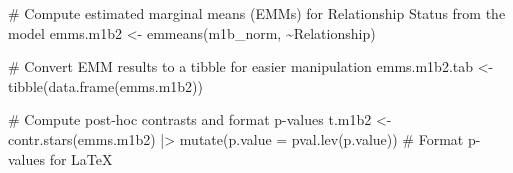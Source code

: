 \documentclass[
  bookmarksnumbered]{article}
\newenvironment{Shaded}{\begin{snugshade}}{\end{snugshade}}
\newcommand{\AttributeTok}[1]{\textcolor[rgb]{0.80,0.80,0.80}{#1}}
\newcommand{\CommentTok}[1]{\textcolor[rgb]{0.50,0.62,0.50}{#1}}
\newcommand{\FunctionTok}[1]{\textcolor[rgb]{0.94,0.94,0.56}{#1}}
\newcommand{\NormalTok}[1]{\textcolor[rgb]{0.80,0.80,0.80}{#1}}
\newcommand{\OtherTok}[1]{\textcolor[rgb]{0.94,0.94,0.56}{#1}}
\newcommand{\SpecialCharTok}[1]{\textcolor[rgb]{0.86,0.64,0.64}{#1}}
\begin{document}
\begin{Shaded}
\begin{Highlighting}[]
\CommentTok{\# Compute estimated marginal means (EMMs) for Relationship Status from the model}
\NormalTok{emms.m1b2 }\OtherTok{\textless{}{-}} \FunctionTok{emmeans}\NormalTok{(m1b\_norm, }\SpecialCharTok{\textasciitilde{}}\NormalTok{Relationship)}

\CommentTok{\# Convert EMM results to a tibble for easier manipulation}
\NormalTok{emms.m1b2.tab }\OtherTok{\textless{}{-}} \FunctionTok{tibble}\NormalTok{(}\FunctionTok{data.frame}\NormalTok{(emms.m1b2))}

\CommentTok{\# Compute post{-}hoc contrasts and format p{-}values}
\NormalTok{t.m1b2 }\OtherTok{\textless{}{-}} \FunctionTok{contr.stars}\NormalTok{(emms.m1b2) }\SpecialCharTok{|\textgreater{}}
  \FunctionTok{mutate}\NormalTok{(}\AttributeTok{p.value =} \FunctionTok{pval.lev}\NormalTok{(p.value)) }\CommentTok{\# Format p{-}values for LaTeX}


\end{Highlighting}
\end{Shaded}
\end{document}
